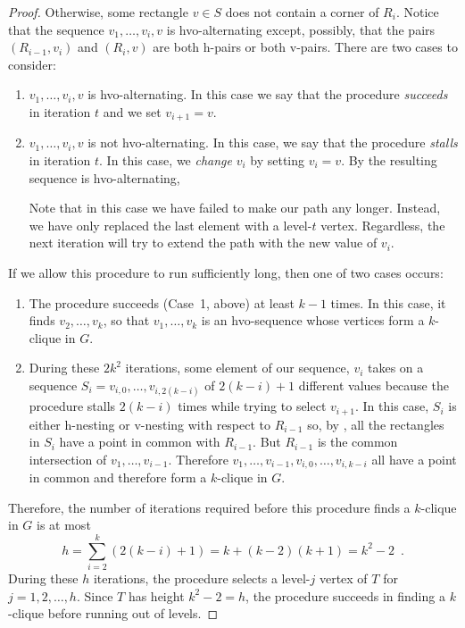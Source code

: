 \documentclass[lotsofwhite]{patmorin}
\newcommand{\iters}{2k^2}
\begin{document}
\begin{proof}
  Otherwise, some rectangle $v\in S$ does not contain a corner of $R_i$.
  Notice that the sequence $v_1,\ldots,v_i,v$ is hvo-alternating except,
  possibly, that the pairs $(R_{i-1},v_i)$ and $(R_i,v)$ are both h-pairs
  or both v-pairs.  There are two cases to consider:
  \begin{enumerate}
     \item $v_1,\ldots,v_i,v$ is hvo-alternating. In this
       case we say that the procedure \emph{succeeds} in iteration $t$
       and we set $v_{i+1}=v$.

     \item $v_1,\ldots,v_i,v$ is not hvo-alternating.  In this case,
       we say that the procedure \emph{stalls} in iteration $t$.
       In this case, we \emph{change} $v_i$ by setting $v_i=v$. By
        the resulting sequence is hvo-alternating,

       Note that in this case we have failed to make our path any
       longer. Instead, we have only replaced the last element with a
       level-$t$ vertex.  Regardless, the next iteration will try to
       extend the path with the new value of $v_i$.
  \end{enumerate}
  If we allow this procedure to run sufficiently long, then one of two
  cases occurs:
  \begin{enumerate}
     \item The procedure succeeds (Case~1, above) at least $k-1$ times.
     In this case, it finds $v_2,\ldots,v_k$, so that $v_1,\ldots,v_k$
     is an hvo-sequence whose vertices form a $k$-clique in $G$.

     \item During these $\iters$ iterations, some element of our sequence,
     $v_i$ takes on a sequence $S_i=v_{i,0},\ldots,v_{i,2(k-i)}$
     of $2(k-i)+1$ different values because the procedure stalls
     $2(k-i)$ times while trying to select $v_{i+1}$.  In this
     case, $S_i$ is either h-nesting or v-nesting with respect
     to $R_{i-1}$ so, by , all the rectangles in
     $S_i$ have a point in common with $R_{i-1}$.  But $R_{i-1}$
     is the common intersection of $v_1,\ldots,v_{i-1}$.  Therefore
     $v_1,\ldots,v_{i-1},v_{i,0},\ldots,v_{i,k-i}$ all have a point in
     common and therefore form a $k$-clique in $G$.
  \end{enumerate}
  Therefore, the number of iterations required before this procedure finds
  a $k$-clique in $G$ is at most
  \[
      h = \sum_{i=2}^k (2(k-i)+1) = k + (k-2)(k+1) = k^2-2 \enspace .
  \]
  During these $h$ iterations, the procedure selects a level-$j$ vertex
  of $T$ for $j=1,2,\ldots,h$.  Since $T$ has height $k^2-2 = h$, the 
  procedure succeeds in finding a $k$-clique before running out of levels.
\end{proof}
\end{document}
